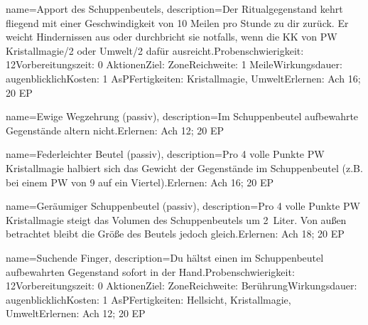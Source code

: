 {
    name={Apport des Schuppenbeutels},
    description={Der Ritualgegenstand kehrt fliegend mit einer Geschwindigkeit von 10 Meilen pro Stunde zu dir zurück. Er weicht Hindernissen aus oder durchbricht sie notfalls, wenn die KK von PW Kristallmagie/2 oder Umwelt/2 dafür ausreicht.\newline Probenschwierigkeit: 12\newline Vorbereitungszeit: 0 Aktionen\newline Ziel: Zone\newline Reichweite: 1 Meile\newline Wirkungsdauer: augenblicklich\newline Kosten: 1 AsP\newline Fertigkeiten: Kristallmagie, Umwelt\newline Erlernen: Ach 16; 20 EP}
}


{
    name={Ewige Wegzehrung (passiv)},
    description={Im Schuppenbeutel aufbewahrte Gegenstände altern nicht.\newline Erlernen: Ach 12; 20 EP}
}


{
    name={Federleichter Beutel (passiv)},
    description={Pro 4 volle Punkte PW Kristallmagie halbiert sich das Gewicht der Gegenstände im Schuppenbeutel (z.B. bei einem PW von 9 auf ein Viertel).\newline Erlernen: Ach 16; 20 EP}
}


{
    name={Geräumiger Schuppenbeutel (passiv)},
    description={Pro 4 volle Punkte PW Kristallmagie steigt das Volumen des Schuppenbeutels um 2 Liter. Von außen betrachtet bleibt die Größe des Beutels jedoch gleich.\newline Erlernen: Ach 18; 20 EP}
}


{
    name={Suchende Finger},
    description={Du hältst einen im Schuppenbeutel aufbewahrten Gegenstand sofort in der Hand.\newline Probenschwierigkeit: 12\newline Vorbereitungszeit: 0 Aktionen\newline Ziel: Zone\newline Reichweite: Berührung\newline Wirkungsdauer: augenblicklich\newline Kosten: 1 AsP\newline Fertigkeiten: Hellsicht, Kristallmagie, Umwelt\newline Erlernen: Ach 12; 20 EP}
}


